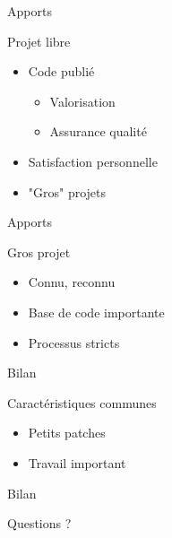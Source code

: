\documentclass[handout]{beamer}
\begin{document}
\begin{frame}{Apports}
    \begin{block}{Projet libre}
        \begin{itemize}[<+->]
            \item Code publié
            \begin{itemize}[<+->]
                \item Valorisation
                \item Assurance qualité
            \end{itemize}
            \item Satisfaction personnelle
            \item "Gros" projets
        \end{itemize}
    \end{block}
\end{frame}

\begin{frame}{Apports}
    \begin{block}{Gros projet}
        \begin{itemize}[<+->]
            \item Connu, reconnu
            \item Base de code importante
            \item Processus stricts
        \end{itemize}
    \end{block}
\end{frame}

\begin{frame}{Bilan}
    \begin{block}{Caractéristiques communes}
        \begin{itemize}[<+->]
            \item Petits patches
            \item Travail important
        \end{itemize}
    \end{block}
\end{frame}

\begin{frame}{Bilan}
    \begin{block}{}
        Questions ?
    \end{block}
\end{frame}
\end{document}
